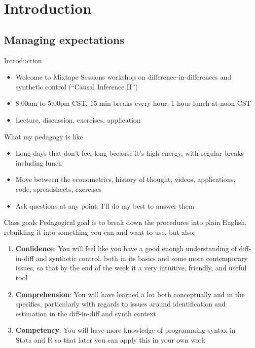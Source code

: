 \documentclass{beamer}
\begin{document}



\section{Introduction}

\subsection{Managing expectations}


\begin{frame}{Introduction}

\begin{itemize}
\item Welcome to Mixtape Sessions workshop on difference-in-differences and synthetic control (``Causal Inference II'')
\item 8:00am to 5:00pm CST, 15 min breaks every hour, 1 hour lunch at noon CST
\item Lecture, discussion, exercises, application
\end{itemize}

\end{frame}


\begin{frame}{What my pedagogy is like}

\begin{itemize}
\item Long days that don't feel long because it's high energy, with regular breaks including lunch
\item Move between the econometrics, history of thought, videos, applications, code, spreadsheets, exercises
\item Ask questions at any point; I'll do my best to answer them
\end{itemize}

\end{frame}


\begin{frame}{Class goals}
Pedagogical goal is to break down the procedures into plain English, rebuilding it into something you can and want to use, but also:

  \begin{enumerate}
    \item \textbf{Confidence}: You will feel like you have a good enough understanding of diff-in-diff and synthetic control, both in its basics and some more contemporary issues, so that by the end of the week it a very intuitive, friendly, and useful tool
    \item \textbf{Comprehension}: You will have learned a lot both conceptually and in the specifics, particularly with regards to issues around identification and estimation in the diff-in-diff and synth context
    \item \textbf{Competency}: You will have more knowledge of programming syntax in Stata and R so that later you can apply this in your own work
  \end{enumerate}

\end{frame}
\end{document}
